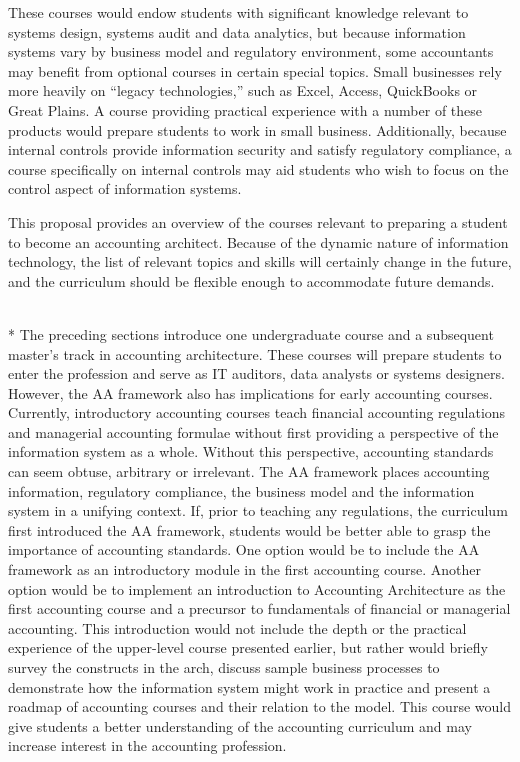 \documentclass[12pt]{article}
\newcommand{\SubSection}[1]{\vspace{.15in}{\centering{}\normalsize{}\textbf{#1}}\\*\indent{}}
\begin{document}
These courses would endow students with significant knowledge relevant to systems design, systems audit and data analytics, but because information systems vary by business model and regulatory environment, some accountants may benefit from optional courses in certain special topics. Small businesses rely more heavily on ``legacy technologies,'' such as Excel, Access, QuickBooks or Great Plains. A course providing practical experience with a number of these products would prepare students to work in small business. Additionally, because internal controls provide information security and satisfy regulatory compliance, a course specifically on internal controls may aid students who wish to focus on the control aspect of information systems.

This proposal provides an overview of the courses relevant to preparing a student to become an accounting architect. Because of the dynamic nature of information technology, the list of relevant topics and skills will certainly change in the future, and the curriculum should be flexible enough to accommodate future demands.

\SubSection{Lower-level Courses}
The preceding sections introduce one undergraduate course and a subsequent master's track in accounting architecture. These courses will prepare students to enter the profession and serve as IT auditors, data analysts or systems designers. However, the AA framework also has implications for early accounting courses. Currently, introductory accounting courses teach financial accounting regulations and managerial accounting formulae without first providing a perspective of the information system as a whole. Without this perspective, accounting standards can seem obtuse, arbitrary or irrelevant. The AA framework places accounting information, regulatory compliance, the business model and the information system in a unifying context. If, prior to teaching any regulations, the curriculum first introduced the AA framework, students would be better able to grasp the importance of accounting standards. One option would be to include the AA framework as an introductory module in the first accounting course. Another option would be to implement an introduction to Accounting Architecture as the first accounting course and a precursor to fundamentals of financial or managerial accounting. This introduction would not include the depth or the practical experience of the upper-level course presented earlier, but rather would briefly survey the constructs in the arch, discuss sample business processes to demonstrate how the information system might work in practice and present a roadmap of accounting courses and their relation to the model. This course would give students a better understanding of the accounting curriculum and may increase interest in the accounting profession.
\end{document}
